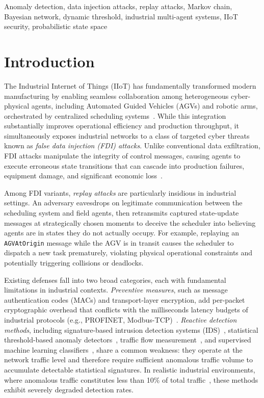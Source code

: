 \documentclass[manuscript,screen,review]{acmart}
\begin{document}
\begin{keywords}
Anomaly detection, data injection attacks, replay attacks,
Markov chain, Bayesian network, dynamic threshold, industrial
multi-agent systems, IIoT security, probabilistic state space
\end{keywords}

\maketitle


\section{Introduction}
\label{sec:intro}

The Industrial Internet of Things (IIoT) has fundamentally
transformed modern manufacturing by enabling seamless collaboration
among heterogeneous cyber-physical agents, including Automated
Guided Vehicles (AGVs) and robotic arms, orchestrated by
centralized scheduling systems~\cite{ref1,ref2}. While this
integration substantially improves operational efficiency and
production throughput, it simultaneously exposes industrial
networks to a class of targeted cyber threats known as
\textit{false data injection (FDI) attacks}. Unlike conventional
data exfiltration, FDI attacks manipulate the integrity of
control messages, causing agents to execute erroneous state
transitions that can cascade into production failures, equipment
damage, and significant economic loss~\cite{ref1,ref2}.

Among FDI variants, \textit{replay attacks} are particularly
insidious in industrial settings. An adversary eavesdrops on
legitimate communication between the scheduling system and field
agents, then retransmits captured state-update messages at
strategically chosen moments to deceive the scheduler into
believing agents are in states they do not actually occupy.
For example, replaying an \texttt{AGVAtOrigin} message while
the AGV is in transit causes the scheduler to dispatch a new
task prematurely, violating physical operational constraints
and potentially triggering collisions or deadlocks.

Existing defenses fall into two broad categories, each with
fundamental limitations in industrial contexts. \textit{Preventive
measures}, such as message authentication codes (MACs) and
transport-layer encryption, add per-packet cryptographic overhead
that conflicts with the milliseconds latency budgets of
industrial protocols (e.g., PROFINET, Modbus-TCP)~\cite{ref14,ref15}.
\textit{Reactive detection methods}, including signature-based
intrusion detection systems (IDS)~\cite{ref3,ref4}, statistical
threshold-based anomaly detectors~\cite{ref8}, traffic flow
measurement~\cite{ref6,ref23}, and supervised machine learning
classifiers~\cite{ref9,ref10,ref11}, share a common weakness:
they operate at the network traffic level and therefore require
sufficient anomalous traffic volume to accumulate detectable
statistical signatures. In realistic industrial environments,
where anomalous traffic constitutes less than 10\% of total
traffic~\cite{ref26}, these methods exhibit severely degraded
detection rates.
\end{document}
